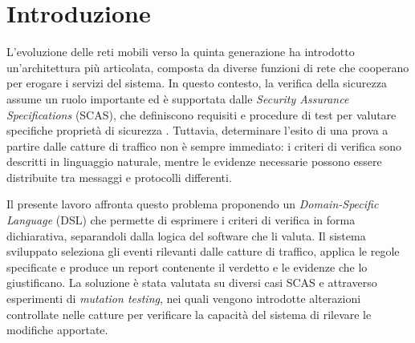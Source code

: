 \chapter{Introduzione}
\label{introduzione}

L'evoluzione delle reti mobili verso la quinta generazione ha introdotto un'architettura più articolata, composta da diverse funzioni di rete che cooperano per erogare i servizi del sistema. In questo contesto, la verifica della sicurezza assume un ruolo importante ed è supportata dalle \emph{Security Assurance Specifications} (SCAS), che definiscono requisiti e procedure di test per valutare specifiche proprietà di sicurezza \cite{3gpp_ts33117_2019,gsma_fs13_2025}. Tuttavia, determinare l'esito di una prova a partire dalle catture di traffico non è sempre immediato: i criteri di verifica sono descritti in linguaggio naturale, mentre le evidenze necessarie possono essere distribuite tra messaggi e protocolli differenti.

Il presente lavoro affronta questo problema proponendo un \emph{Domain-Specific Language} (DSL) che permette di esprimere i criteri di verifica in forma dichiarativa, separandoli dalla logica del software che li valuta. Il sistema sviluppato seleziona gli eventi rilevanti dalle catture di traffico, applica le regole specificate e produce un report contenente il verdetto e le evidenze che lo giustificano. La soluzione è stata valutata su diversi casi SCAS e attraverso esperimenti di \emph{mutation testing}, nei quali vengono introdotte alterazioni controllate nelle catture per verificare la capacità del sistema di rilevare le modifiche apportate.
